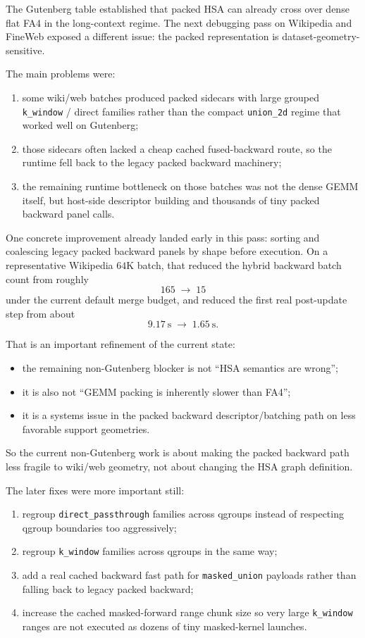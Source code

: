 \documentclass[11pt]{article}
\begin{document}
The Gutenberg table established that packed HSA can already cross over dense
flat FA4 in the long-context regime. The next debugging pass on Wikipedia and
FineWeb exposed a different issue: the packed representation is
dataset-geometry-sensitive.

The main problems were:
\begin{enumerate}[leftmargin=1.5em]
    \item some wiki/web batches produced packed sidecars with large grouped
    \texttt{k\_window} / direct families rather than the compact
    \texttt{union\_2d} regime that worked well on Gutenberg;
    \item those sidecars often lacked a cheap cached fused-backward route, so
    the runtime fell back to the legacy packed backward machinery;
    \item the remaining runtime bottleneck on those batches was not the dense
    GEMM itself, but host-side descriptor building and thousands of tiny packed
    backward panel calls.
\end{enumerate}

One concrete improvement already landed early in this pass: sorting and
coalescing legacy packed backward panels by shape before execution. On a
representative Wikipedia $64$K batch, that reduced the hybrid backward batch
count from roughly
\[
165 \;\longrightarrow\; 15
\]
under the current default merge budget, and reduced the first real post-update
step from about
\[
9.17\ \mathrm{s} \;\longrightarrow\; 1.65\ \mathrm{s}.
\]

That is an important refinement of the current state:
\begin{itemize}[leftmargin=1.5em]
    \item the remaining non-Gutenberg blocker is not ``HSA semantics are
    wrong'';
    \item it is also not ``GEMM packing is inherently slower than FA4'';
    \item it is a systems issue in the packed backward descriptor/batching path
    on less favorable support geometries.
\end{itemize}

So the current non-Gutenberg work is about making the packed backward path less
fragile to wiki/web geometry, not about changing the HSA graph definition.

The later fixes were more important still:
\begin{enumerate}[leftmargin=1.5em]
    \item regroup \texttt{direct\_passthrough} families across qgroups instead
    of respecting qgroup boundaries too aggressively;
    \item regroup \texttt{k\_window} families across qgroups in the same way;
    \item add a real cached backward fast path for \texttt{masked\_union}
    payloads rather than falling back to legacy packed backward;
    \item increase the cached masked-forward range chunk size so very large
    \texttt{k\_window} ranges are not executed as dozens of tiny masked-kernel
    launches.
\end{enumerate}
\end{document}
